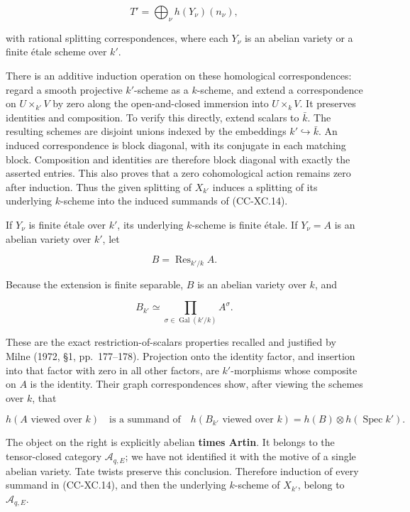 \[
 T'=\bigoplus_\nu h(Y_\nu)(n_\nu),
 \tag{CC-XC.14}
\]

with rational splitting correspondences, where each \(Y_\nu\) is an
abelian variety or a finite étale scheme over \(k'\).

There is an additive induction operation on these homological
correspondences: regard a smooth projective \(k'\)-scheme as a
\(k\)-scheme, and extend a correspondence on \(U\times_{k'}V\) by zero
along the open-and-closed immersion into \(U\times_kV\). It preserves
identities and composition. To verify this directly, extend scalars to
\(\bar k\). The resulting schemes are disjoint unions indexed by the
embeddings \(k'\hookrightarrow\bar k\). An induced correspondence is
block diagonal, with its conjugate in each matching block. Composition
and identities are therefore block diagonal with exactly the asserted
entries. This also proves that a zero cohomological action remains zero
after induction. Thus the given splitting of \(X_{k'}\) induces a
splitting of its underlying \(k\)-scheme into the induced summands of
(CC-XC.14).

If \(Y_\nu\) is finite étale over \(k'\), its underlying \(k\)-scheme is
finite étale. If \(Y_\nu=A\) is an abelian variety over \(k'\), let

\[
 B=\operatorname{Res}_{k'/k}A.
\]

Because the extension is finite separable, \(B\) is an abelian variety
over \(k\), and

\[
 B_{k'}\simeq
 \prod_{\sigma\in\operatorname{Gal}(k'/k)} A^\sigma .
 \tag{CC-XC.15}
\]

These are the exact restriction-of-scalars properties recalled and
justified by Milne (1972, §1, pp.~177--178). Projection onto the
identity factor, and insertion into that factor with zero in all other
factors, are \(k'\)-morphisms whose composite on \(A\) is the identity.
Their graph correspondences show, after viewing the schemes over \(k\),
that

\[
 h(A\text{ viewed over }k)
 \quad\text{is a summand of}\quad
 h(B_{k'}\text{ viewed over }k)
 =h(B)\otimes h(\operatorname{Spec}k').
 \tag{CC-XC.16}
\]

The object on the right is explicitly abelian \textbf{times Artin}. It
belongs to the tensor-closed category \(\mathcal A_{q,E}\); we have not
identified it with the motive of a single abelian variety. Tate twists
preserve this conclusion. Therefore induction of every summand in
(CC-XC.14), and then the underlying \(k\)-scheme of \(X_{k'}\), belong
to \(\mathcal A_{q,E}\).

